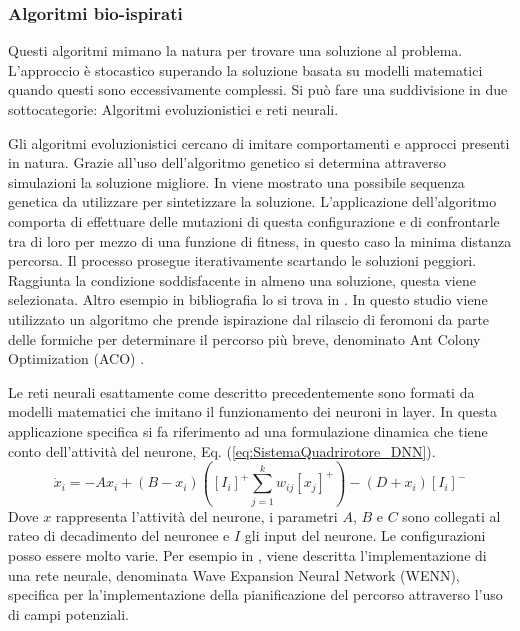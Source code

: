 \subsubsection{Algoritmi bio-ispirati}
Questi algoritmi mimano la natura per trovare una soluzione al problema. L'approccio è stocastico superando la soluzione basata su modelli matematici quando questi sono eccessivamente complessi.
Si può fare una suddivisione in due sottocategorie: Algoritmi evoluzionistici e reti neurali.

Gli algoritmi evoluzionistici cercano di imitare comportamenti e approcci presenti in natura. Grazie all'uso dell'algoritmo genetico si determina attraverso simulazioni la soluzione migliore. In \cite{6564703} viene mostrato una possibile sequenza genetica da utilizzare per sintetizzare  la soluzione. L'applicazione dell'algoritmo comporta di effettuare delle mutazioni di questa configurazione e di confrontarle tra di loro per mezzo di una funzione di fitness, in questo caso la minima distanza percorsa. Il processo prosegue iterativamente scartando le soluzioni peggiori. Raggiunta la condizione soddisfacente in almeno una soluzione, questa viene selezionata.
Altro esempio in bibliografia lo si trova in \cite{DuanHaibin2010Tppf}. In questo studio viene utilizzato un algoritmo che prende ispirazione dal rilascio di feromoni da parte delle formiche per determinare il percorso più breve, denominato Ant Colony Optimization (ACO) .

Le reti neurali esattamente come descritto precedentemente sono formati da modelli matematici che imitano il funzionamento dei neuroni in layer. In questa applicazione specifica si fa riferimento ad una formulazione dinamica che tiene conto dell'attività del neurone, Eq. (\ref{eq:SistemaQuadrirotore_DNN}).
\begin{equation}\label{eq:SistemaQuadrirotore_DNN}
	\dot{x}_i = -A x_i + (B -x_i) \left([I_i]^+ \sum_{j=1}^{k}w_{ij}[x_j]^+ \right) - (D + x_i) [I_i]^-
\end{equation}
Dove $x$ rappresenta l'attività del neurone, i parametri $A$, $B$ e $C$ sono collegati al rateo di decadimento del neuronee e $I$ gli input del neurone.
Le configurazioni posso essere molto varie. Per esempio in \cite{KassimA.A1992Anna}, viene descritta l'implementazione di una rete neurale, denominata Wave Expansion Neural Network (WENN), specifica per la'implementazione della pianificazione del percorso attraverso l'uso di campi potenziali. 


